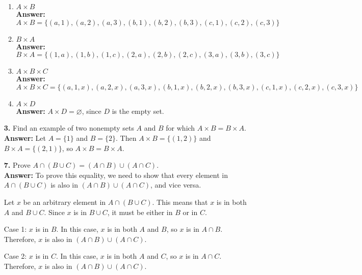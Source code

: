 \documentclass[12pt,reqno]{amsart}
\renewcommand{\emptyset}{\ensuremath{\varnothing}}
\begin{document}
\begin{enumerate}[{\bf 1.}]
\begin{multicols}{2}
\begin{enumerate}
\item
$A \times B$ \\
\textbf{Answer:} $A \times B = \{ (a, 1), (a, 2), (a, 3), (b, 1), (b, 2), (b, 3), (c, 1), (c, 2), (c, 3) \}$

\item
$B \times A$ \\
\textbf{Answer:} $B \times A = \{ (1, a), (1, b), (1, c), (2, a), (2, b), (2, c), (3, a), (3, b), (3, c) \}$

\item
$A \times B \times C$ \\
\textbf{Answer:} $A \times B \times C = \{ (a, 1, x), (a, 2, x), (a, 3, x), (b, 1, x), (b, 2, x), (b, 3, x), (c, 1, x), (c, 2, x), (c, 3, x) \}$

\item
$A \times D$ \\
\textbf{Answer:} $A \times D = \emptyset$, since $D$ is the empty set.

\end{enumerate}
\end{multicols}

\medskip  

\item[{\bf 3.}]
Find an example of two nonempty sets $A$ and $B$ for which $A \times B = B \times A$. \\
\textbf{Answer:} Let $A = \{1\}$ and $B = \{2\}$. Then $A \times B = \{(1, 2)\}$ and $B \times A = \{(2, 1)\}$, so $A \times B = B \times A$.

\medskip
 
\item[{\bf 7.}]
Prove $A \cap (B \cup C) = (A \cap B) \cup (A \cap C)$. \\
\textbf{Answer:} To prove this equality, we need to show that every element in $A \cap (B \cup C)$ is also in $(A \cap B) \cup (A \cap C)$, and vice versa.

Let $x$ be an arbitrary element in $A \cap (B \cup C)$. This means that $x$ is in both $A$ and $B \cup C$. Since $x$ is in $B \cup C$, it must be either in $B$ or in $C$. 

Case 1: $x$ is in $B$. In this case, $x$ is in both $A$ and $B$, so $x$ is in $A \cap B$. Therefore, $x$ is also in $(A \cap B) \cup (A \cap C)$.

Case 2: $x$ is in $C$. In this case, $x$ is in both $A$ and $C$, so $x$ is in $A \cap C$. Therefore, $x$ is also in $(A \cap B) \cup (A \cap C)$.


\end{enumerate}
\end{document}
